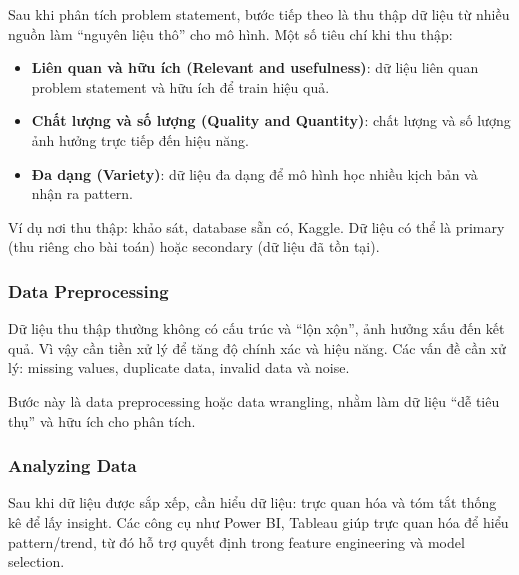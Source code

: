 \begin{phuongphap}[title={Thu thập dữ liệu}]
Sau khi phân tích problem statement, bước tiếp theo là thu thập dữ liệu từ nhiều nguồn làm “nguyên liệu thô” cho mô hình.
Một số tiêu chí khi thu thập:
\begin{itemize}
  \item \textbf{Liên quan và hữu ích (Relevant and usefulness)}: dữ liệu liên quan problem statement và hữu ích để train hiệu quả.
  \item \textbf{Chất lượng và số lượng (Quality and Quantity)}: chất lượng và số lượng ảnh hưởng trực tiếp đến hiệu năng.
  \item \textbf{Đa dạng (Variety)}: dữ liệu đa dạng để mô hình học nhiều kịch bản và nhận ra pattern.
\end{itemize}
Ví dụ nơi thu thập: khảo sát, database sẵn có, Kaggle. Dữ liệu có thể là primary (thu riêng cho bài toán) hoặc secondary (dữ liệu đã tồn tại).
\end{phuongphap}

\subsubsection{Data Preprocessing}

\begin{phuongphap}[title={Tiền xử lý dữ liệu}]
Dữ liệu thu thập thường không có cấu trúc và “lộn xộn”, ảnh hưởng xấu đến kết quả.
Vì vậy cần tiền xử lý để tăng độ chính xác và hiệu năng.
Các vấn đề cần xử lý: missing values, duplicate data, invalid data và noise.
\end{phuongphap}

\begin{luuy}[title={Tiền xử lý dữ liệu (Data wrangling)}]
Bước này là data preprocessing hoặc data wrangling, nhằm làm dữ liệu “dễ tiêu thụ” và hữu ích cho phân tích.
\end{luuy}

\subsubsection{Analyzing Data}

\begin{phuongphap}[title={Phân tích dữ liệu}]
Sau khi dữ liệu được sắp xếp, cần hiểu dữ liệu:
trực quan hóa và tóm tắt thống kê để lấy insight.
Các công cụ như Power BI, Tableau giúp trực quan hóa để hiểu pattern/trend, từ đó hỗ trợ quyết định trong feature engineering và model selection.
\end{phuongphap}

